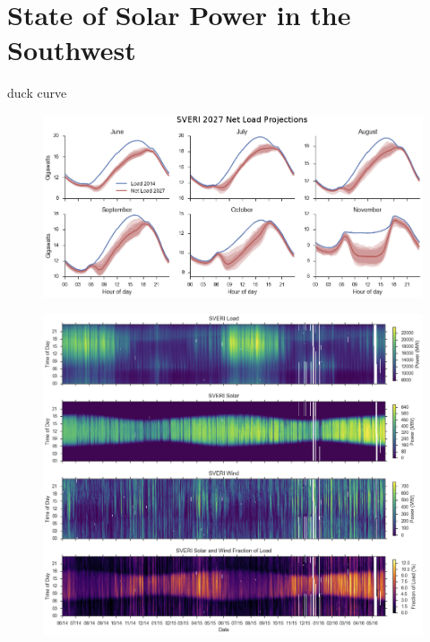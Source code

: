 \section{State of Solar Power in the Southwest}
duck curve

\begin{figure}[h]
\centering
\includegraphics[width=\textwidth]{figs/duckcurves.png}
\end{figure}

\begin{figure}[h]
\centering
\includegraphics[width=\textwidth]{figs/sveri_heat.png}
\end{figure}


